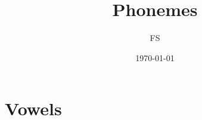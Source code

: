 \documentclass[12pt,oneside]{book}
\begin{document}
\title{Phonemes}
\author{FS}
\date{\today}
\maketitle

\frontmatter
\tableofcontents
\mainmatter

\chapter{Vowels}




\end{document}

